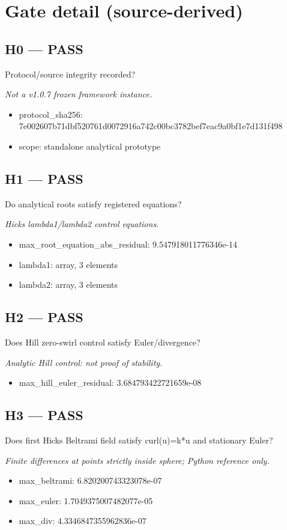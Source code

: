 \documentclass[10pt,a4paper]{article}
\begin{document}
\section*{Gate detail (source-derived)}
\subsection*{H0 --- PASS}
Protocol/source integrity recorded?
\par\textit{Not a v1.0.7 frozen framework instance.}\par
\begin{itemize}
\item protocol\_sha256: 7e002607b71dbf520761d0072916a742c00bc3782bef7eac9a0bf1e7d131f498
\item scope: standalone analytical prototype
\end{itemize}
\subsection*{H1 --- PASS}
Do analytical roots satisfy registered equations?
\par\textit{Hicks lambda1/lambda2 control equations.}\par
\begin{itemize}
\item max\_root\_equation\_abs\_residual: 9.547918011776346e-14
\item lambda1: array, 3 elements
\item lambda2: array, 3 elements
\end{itemize}
\subsection*{H2 --- PASS}
Does Hill zero-swirl control satisfy Euler/divergence?
\par\textit{Analytic Hill control: not proof of stability.}\par
\begin{itemize}
\item max\_hill\_euler\_residual: 3.684793422721659e-08
\end{itemize}
\subsection*{H3 --- PASS}
Does first Hicks Beltrami field satisfy curl(u)=k*u and stationary Euler?
\par\textit{Finite differences at points strictly inside sphere; Python reference only.}\par
\begin{itemize}
\item max\_beltrami: 6.820200743323078e-07
\item max\_euler: 1.7049375007482077e-05
\item max\_div: 4.3346847355962836e-07
\end{itemize}
\end{document}
